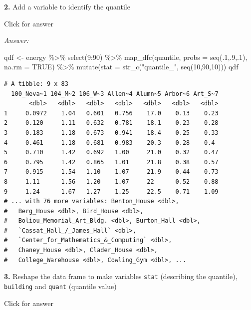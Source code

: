 \documentclass[
]{book}
\newenvironment{Shaded}{\begin{snugshade}}{\end{snugshade}}
\newcommand{\AttributeTok}[1]{\textcolor[rgb]{0.77,0.63,0.00}{#1}}
\newcommand{\ConstantTok}[1]{\textcolor[rgb]{0.00,0.00,0.00}{#1}}
\newcommand{\DecValTok}[1]{\textcolor[rgb]{0.00,0.00,0.81}{#1}}
\newcommand{\FunctionTok}[1]{\textcolor[rgb]{0.00,0.00,0.00}{#1}}
\newcommand{\NormalTok}[1]{#1}
\newcommand{\OtherTok}[1]{\textcolor[rgb]{0.56,0.35,0.01}{#1}}
\newcommand{\SpecialCharTok}[1]{\textcolor[rgb]{0.00,0.00,0.00}{#1}}
\newcommand{\StringTok}[1]{\textcolor[rgb]{0.31,0.60,0.02}{#1}}
\begin{document}
\textbf{2.} Add a variable to identify the quantile

Click for answer

\emph{Answer:}

\begin{Shaded}
\begin{Highlighting}[]
\NormalTok{qdf }\OtherTok{\textless{}{-}}\NormalTok{ energy }\SpecialCharTok{\%\textgreater{}\%} \FunctionTok{select}\NormalTok{(}\DecValTok{9}\SpecialCharTok{:}\DecValTok{90}\NormalTok{) }\SpecialCharTok{\%\textgreater{}\%}
  \FunctionTok{map\_dfc}\NormalTok{(quantile, }\AttributeTok{probs =} \FunctionTok{seq}\NormalTok{(.}\DecValTok{1}\NormalTok{,.}\DecValTok{9}\NormalTok{,.}\DecValTok{1}\NormalTok{), }\AttributeTok{na.rm =} \ConstantTok{TRUE}\NormalTok{) }\SpecialCharTok{\%\textgreater{}\%}  
  \FunctionTok{mutate}\NormalTok{(}\AttributeTok{stat =} \FunctionTok{str\_c}\NormalTok{(}\StringTok{"quantile\_"}\NormalTok{, }\FunctionTok{seq}\NormalTok{(}\DecValTok{10}\NormalTok{,}\DecValTok{90}\NormalTok{,}\DecValTok{10}\NormalTok{))) }
\NormalTok{qdf}
\end{Highlighting}
\end{Shaded}

\begin{verbatim}
# A tibble: 9 x 83
  100_Neva~1 104_M~2 106_W~3 Allen~4 Alumn~5 Arbor~6 Art_S~7
       <dbl>   <dbl>   <dbl>   <dbl>   <dbl>   <dbl>   <dbl>
1     0.0972    1.04   0.601   0.756    17.0    0.13    0.23
2     0.120     1.11   0.632   0.781    18.1    0.23    0.28
3     0.183     1.18   0.673   0.941    18.4    0.25    0.33
4     0.461     1.18   0.681   0.983    20.3    0.28    0.4 
5     0.710     1.42   0.692   1.00     21.0    0.32    0.47
6     0.795     1.42   0.865   1.01     21.8    0.38    0.57
7     0.915     1.54   1.10    1.07     21.9    0.44    0.73
8     1.11      1.56   1.20    1.07     22      0.52    0.88
9     1.24      1.67   1.27    1.25     22.5    0.71    1.09
# ... with 76 more variables: Benton_House <dbl>,
#   Berg_House <dbl>, Bird_House <dbl>,
#   Boliou_Memorial_Art_Bldg. <dbl>, Burton_Hall <dbl>,
#   `Cassat_Hall_/_James_Hall` <dbl>,
#   `Center_for_Mathematics_&_Computing` <dbl>,
#   Chaney_House <dbl>, Clader_House <dbl>,
#   College_Warehouse <dbl>, Cowling_Gym <dbl>, ...
\end{verbatim}

\textbf{3.} Reshape the data frame to make variables \texttt{stat} (describing the quantile), \texttt{building} and \texttt{quant} (quantile value)

Click for answer
\end{document}
